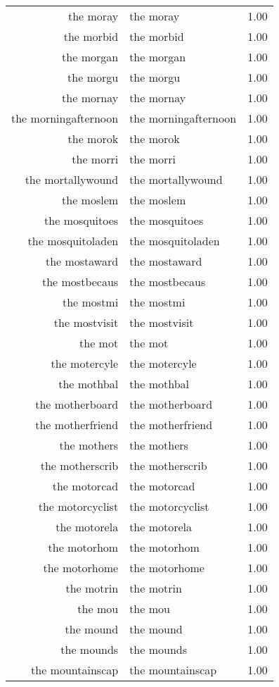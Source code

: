 \begin{table}[ht]
\begin{tabular}{rlr}
  the moray & the moray & 1.00 \\ 
  the morbid & the morbid & 1.00 \\ 
  the morgan & the morgan & 1.00 \\ 
  the morgu & the morgu & 1.00 \\ 
  the mornay & the mornay & 1.00 \\ 
  the morningafternoon & the morningafternoon & 1.00 \\ 
  the morok & the morok & 1.00 \\ 
  the morri & the morri & 1.00 \\ 
  the mortallywound & the mortallywound & 1.00 \\ 
  the moslem & the moslem & 1.00 \\ 
  the mosquitoes & the mosquitoes & 1.00 \\ 
  the mosquitoladen & the mosquitoladen & 1.00 \\ 
  the mostaward & the mostaward & 1.00 \\ 
  the mostbecaus & the mostbecaus & 1.00 \\ 
  the mostmi & the mostmi & 1.00 \\ 
  the mostvisit & the mostvisit & 1.00 \\ 
  the mot & the mot & 1.00 \\ 
  the motercyle & the motercyle & 1.00 \\ 
  the mothbal & the mothbal & 1.00 \\ 
  the motherboard & the motherboard & 1.00 \\ 
  the motherfriend & the motherfriend & 1.00 \\ 
  the mothers & the mothers & 1.00 \\ 
  the motherscrib & the motherscrib & 1.00 \\ 
  the motorcad & the motorcad & 1.00 \\ 
  the motorcyclist & the motorcyclist & 1.00 \\ 
  the motorela & the motorela & 1.00 \\ 
  the motorhom & the motorhom & 1.00 \\ 
  the motorhome & the motorhome & 1.00 \\ 
  the motrin & the motrin & 1.00 \\ 
  the mou & the mou & 1.00 \\ 
  the mound & the mound & 1.00 \\ 
  the mounds & the mounds & 1.00 \\ 
  the mountainscap & the mountainscap & 1.00 \\ 

\end{tabular}
\end{table}
